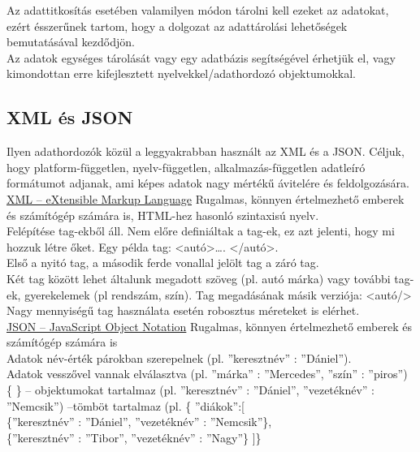 
Az adattitkosítás esetében valamilyen módon tárolni kell ezeket az adatokat, ezért ésszerűnek tartom, hogy a dolgozat az adattárolási lehetőségek bemutatásával kezdődjön.
\newline
\\Az adatok egységes tárolását vagy egy adatbázis segítségével érhetjük el, vagy kimondottan erre kifejlesztett nyelvekkel/adathordozó objektumokkal.

\subsection{XML és JSON}
 Ilyen adathordozók közül a leggyakrabban használt az XML és a JSON. Céljuk, hogy platform-független, nyelv-független, alkalmazás-független adatleíró formátumot adjanak, ami képes adatok nagy mértékű ávitelére és feldolgozására.
\newline
\\ \underline{XML – eXtensible Markup Language}
\vspace{10pt}
\newline \noindent Rugalmas, könnyen értelmezhető emberek és számítógép számára is, HTML-hez hasonló szintaxisú nyelv. 
\vspace{5pt}\\Felépítése tag-ekből áll. Nem előre definiáltak a tag-ek, ez azt jelenti, hogy mi hozzuk létre őket. Egy példa tag: <autó>…. </autó>.
\vspace{5pt}\\Első a nyitó tag, a második ferde vonallal jelölt tag a záró tag.
\\Két tag között lehet általunk megadott szöveg (pl. autó márka) vagy további tag-ek, gyerekelemek (pl rendszám, szín). Tag megadásának másik verziója: <autó/>
\vspace{5pt}\\Nagy mennyiségű tag használata esetén robosztus méreteket is elérhet.
\newline
\\ \underline{JSON – JavaScript Object Notation}
\vspace{10pt}
\newline \noindent Rugalmas, könnyen értelmezhető emberek és számítógép számára is
\\ Adatok név-érték párokban szerepelnek (pl. ”keresztnév” : ”Dániel”).
\\ Adatok vesszővel vannak elválasztva (pl. ”márka” : ”Mercedes”, ”szín” : ”piros”)
\\ \{ \} – objektumokat tartalmaz (pl. {”keresztnév” : ”Dániel”, ”vezetéknév” : ”Nemcsik”})
\newline [ ] –tömböt tartalmaz (pl. \{ ”diákok”:[
\\  \indent	\{”keresztnév” : ”Dániel”, ”vezetéknév” : ”Nemcsik”\},
\\  \indent \{”keresztnév” : ”Tibor”, ”vezetéknév” : ”Nagy”\}
]\}

